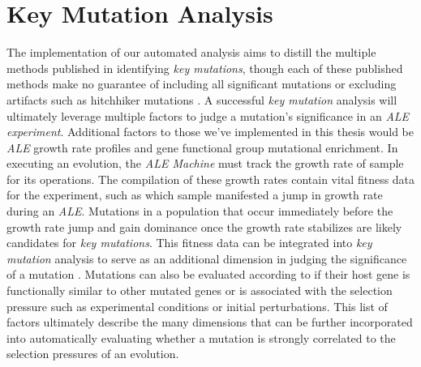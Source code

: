 \documentclass[12pt,final,masters,chapterheads]{ucsd}  %
\begin{document}
\section{Key Mutation Analysis}

%
%
%
%
The implementation of our automated analysis aims to distill the multiple methods published in identifying \textit{key mutations}, though each of these published methods make no guarantee of including all significant mutations or excluding artifacts such as hitchhiker mutations \cite{pmid25304508}. A successful \textit{key mutation} analysis will ultimately leverage multiple factors to judge a mutation's significance in an \textit{ALE experiment}. Additional factors to those we've implemented in this thesis would be \textit{ALE} growth rate profiles and gene functional group mutational enrichment. In executing an evolution, the \textit{ALE Machine} must track the growth rate of sample for its operations. The compilation of these growth rates contain vital fitness data for the experiment, such as which sample manifested a jump in growth rate during an \textit{ALE}. Mutations in a population that occur immediately before the growth rate jump and gain dominance once the growth rate stabilizes are likely candidates for \textit{key mutations}. This fitness data can be integrated into \textit{key mutation} analysis to serve as an additional dimension in judging the significance of a mutation \cite{pmid25304508}. Mutations can also be evaluated according to if their host gene is functionally similar to other mutated genes or is associated with the selection pressure such as experimental conditions or initial perturbations. This list of factors ultimately describe the many dimensions that can be further incorporated into automatically evaluating whether a mutation is strongly correlated to the selection pressures of an evolution.
\end{document}
